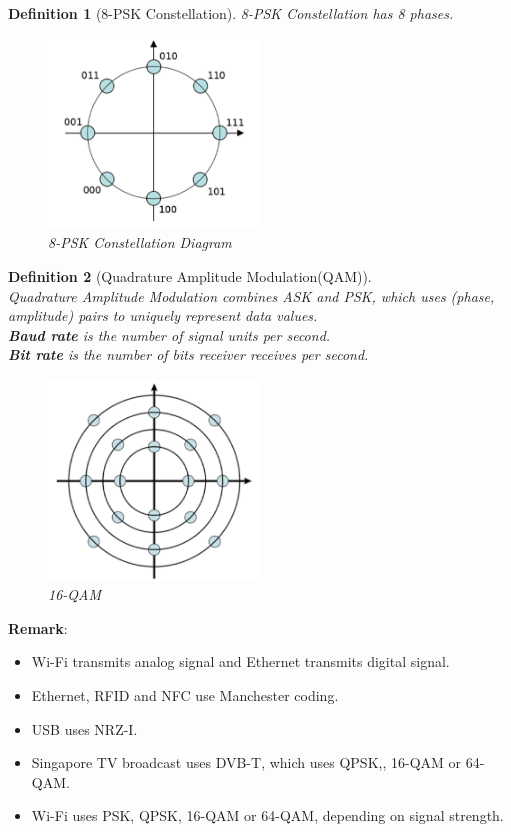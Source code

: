 \documentclass[12pt]{article}
\newtheorem{definition}{Definition}[section]
\theoremstyle{definition}
\begin{document}
\begin{definition}[8-PSK Constellation]
8-PSK Constellation has 8 phases.
\hfill\\\normalfont
\begin{figure}[h]
\centering
\includegraphics[width = 0.5\textwidth]{10_2_4.png}
\caption{8-PSK Constellation Diagram}
\end{figure}
\end{definition}
\begin{definition}[Quadrature Amplitude Modulation(QAM)]
\hfill\\\normalfont Quadrature Amplitude Modulation combines ASK and PSK, which uses (phase, amplitude) pairs to uniquely represent data values.\\
\textbf{Baud rate} is the number of signal units per second.\\
\textbf{Bit rate} is the number of bits receiver receives per second.
\clearpage
\begin{figure}[h]
\centering
\includegraphics[width = 0.5\textwidth]{10_2_5.png}
\caption{16-QAM}
\end{figure}
\end{definition}
\textbf{Remark}: 
\begin{itemize}
  \item Wi-Fi transmits analog signal and Ethernet transmits digital signal.
  \item Ethernet, RFID and NFC use Manchester coding.
  \item USB uses NRZ-I.
  \item Singapore TV broadcast uses DVB-T, which uses QPSK,, 16-QAM or 64-QAM.
  \item Wi-Fi uses PSK, QPSK, 16-QAM or 64-QAM, depending on signal strength.
\end{itemize}
\end{document}
